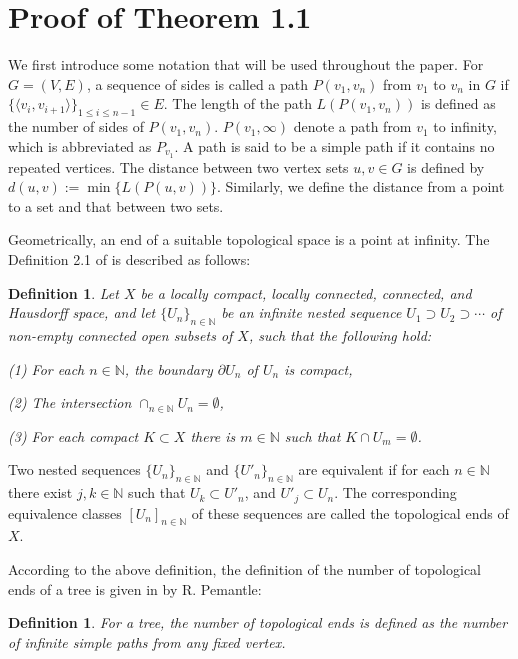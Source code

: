 \documentclass[10pt,twoside]{article}
\newtheorem{definition}[theorem]{Definition}
\begin{document}
\section{Proof of Theorem 1.1}
We first introduce some notation that will be used throughout the paper. For $G=(V, E)$, a sequence of sides is called a path $P(v_{1},v_{n})$ from $v_{1}$ to $v_{n}$ in $G$ if $\{\langle v_{i}, v_{i+1}\rangle\}_{1\leq i\leq n-1}\in E$. The length of the path $L(P(v_{1},v_{n}))$ is defined as the number of sides of $P(v_{1},v_{n})$. $P(v_{1},\infty)$ denote a path from $v_1$ to infinity, which is abbreviated as $P_{v_1}$. A path is said to be a simple path if it contains no repeated vertices. The distance between two vertex sets $u,v\in G$ is defined by $d(u,v):=\min\{L(P(u,v))\}$. Similarly, we define the distance from a point to a set and that between two sets.

Geometrically, an end of a suitable topological space is a point at infinity. The Definition 2.1 of \cite{AQR2026} is described as follows:
\begin{definition}\label{def1}
Let $X$ be a locally compact, locally connected, connected, and Hausdorff space, and let $\{U_n\}_{n\in \mathbb{N}}$ be an infinite nested sequence $U_1 \supset U_2 \supset \cdots$ of non-empty connected open subsets of $X$, such that the following hold:

(1) For each $n \in \mathbb{N}$, the boundary $\partial U_n$ of $U_n$ is compact,

(2) The intersection $\cap_{n\in \mathbb{N}} U_n = \emptyset$,

(3) For each compact $K \subset X$ there is $m \in \mathbb{N}$ such that $K \cap U_m = \emptyset$.
\end{definition}

Two nested sequences $\{U_n\}_{n\in \mathbb{N}}$ and $\{U'_n\}_{n\in \mathbb{N}}$ are equivalent if for each $n \in \mathbb{N}$ there exist $j, k \in \mathbb{N}$ such that $U_k \subset U'_n$, and $U'_j \subset U_n$. The corresponding equivalence classes $ [U_n]_{n\in \mathbb{N}}$ of these sequences are called the topological ends of $X$.

According to the above definition, the definition of the number of topological ends of a tree is given in \cite{P2004} by R. Pemantle:

\begin{definition}\label{def2}
For a tree, the number of topological ends is defined as the number of infinite simple paths from any fixed vertex.
\end{definition}
\end{document}
